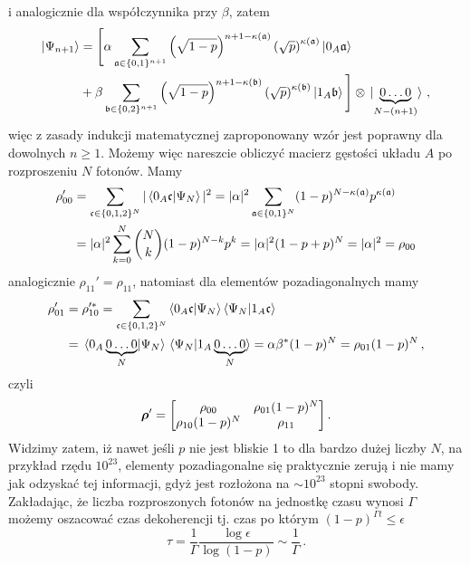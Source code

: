 \documentclass{myclass}
\begin{document}
i analogicznie dla współczynnika przy \(\beta\), zatem
\begin{equation*}
    \begin{split}
        \ket{\Psi_{n+1}} &= \Bigg[\alpha\sum_{\mathfrak{a}\in\{0,1\}^{n+1}}\left(\sqrt{1-p}\right)^{n+1-\kappa(\mathfrak{a})}\left(\sqrt{p}\right)^{\kappa(\mathfrak{a})}\ket{0_A\mathfrak{a}} \\
        &+ \beta\sum_{\mathfrak{b}\in\{0,2\}^{n+1}}\left(\sqrt{1-p}\right)^{n+1-\kappa(\mathfrak{b})}\left(\sqrt{p}\right)^{\kappa(\mathfrak{b})}\ket{1_A\mathfrak{b}} \Bigg] \otimes \ket*{\underbrace{0\ldots 0}_{N-(n+1)}}\,,
    \end{split}
\end{equation*}
więc z zasady indukcji matematycznej zaproponowany wzór jest poprawny dla dowolnych \(n \geq 1\).
Możemy więc nareszcie obliczyć macierz gęstości układu \(A\) po rozproszeniu \(N\) fotonów. Mamy
\begin{equation*}
    \begin{split}
        \rho_{00}' &= \sum_{\mathfrak{c} \in \{0,1,2\}^N} |\braket{0_A\mathfrak{c}}{\Psi_N}|^2 = |\alpha|^2\sum_{\mathfrak{a} \in \{0,1\}^N}(1-p)^{N-\kappa(\mathfrak{a})}p^{\kappa(\mathfrak{a})} \\
        &= |\alpha|^2\sum_{k=0}^N {N \choose k} (1-p)^{N-k}p^k = |\alpha|^2(1-p+p)^N = |\alpha|^2 = \rho_{00}
    \end{split}
\end{equation*}
analogicznie \(\rho_{11}' = \rho_{11}\), natomiast dla elementów pozadiagonalnych mamy
\begin{equation*}
    \begin{split}
        \rho_{01}' &= \rho_{10}'^* = \sum_{\mathfrak{c} \in \{0,1,2\}^N} \braket{0_A\mathfrak{c}}{\Psi_N}\braket{\Psi_N}{1_A\mathfrak{c}} \\
        &= \braket*{0_A\underbrace{0\ldots0}_N}{\Psi_N}\braket*{\Psi_N}{1_A\underbrace{0\ldots0}_N} = \alpha\beta^*(1-p)^N = \rho_{01}(1-p)^N\,,
    \end{split}
\end{equation*}
czyli
\begin{equation*}
    \oper{\rho}' = \mqty[\rho_{00} & \rho_{01}(1-p)^N \\ \rho_{10}(1-p)^N & \rho_{11}]\,.
\end{equation*}
Widzimy zatem, iż nawet jeśli \(p\) nie jest bliskie 1 to dla bardzo dużej liczby \(N\), na przykład
rzędu \(10^{23}\), elementy pozadiagonalne się praktycznie zerują i nie mamy jak odzyskać tej
informacji, gdyż jest rozłożona na \(\sim 10^{23}\) stopni swobody. Zakładając, że liczba rozproszonych fotonów na jednostkę czasu wynosi \(\Gamma\) możemy oszacować czas dekoherencji tj. czas po którym \((1-p)^{\Gamma t} \leq \epsilon\)
\begin{equation*}
    \tau = \frac{1}{\Gamma}\frac{\log\epsilon}{\log(1-p)} \sim \frac{1}{\Gamma}\,.
\end{equation*}
\end{document}
